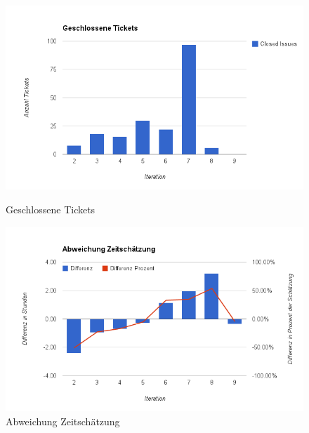\begin{figure}
	\begin{minipage}[t]{0.45\textwidth}
		\includegraphics[width=\linewidth]{images/zeitplanung/chart_3}
		\caption{Geschlossene Tickets}
		\label{zeitanalyse:tickets}
	\end{minipage}
	\hspace{\fill}
	\begin{minipage}[t]{0.45\textwidth}
		\includegraphics[width=\linewidth]{images/zeitplanung/chart_4}
		\caption{Abweichung Zeitschätzung}
		\label{zeitanalyse:abweichung}
	\end{minipage}

\end{figure}

